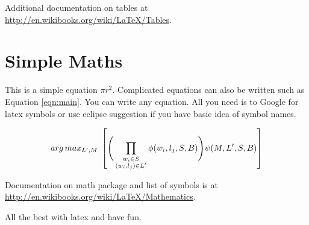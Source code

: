 \documentclass[bsc,logo]{infthesis}
\begin{document}
Additional documentation on tables at
\url{http://en.wikibooks.org/wiki/LaTeX/Tables}.

\section{Simple Maths}
This is a simple equation $\pi r^2$. Complicated equations can also be written
such as Equation \ref{eqn:main}. You can write any equation. All you need is to
Google for latex symbols or use eclipse suggestion if you have basic idea of symbol names.

 \begin{equation}
 \centering
 \label{eqn:main}
 arg\,max_{L', M} \; \left[ \Bigg(  \prod_{\substack{ w_i \in S \\  (w_i, l_j) 
 \in L'  }} \phi(w_i, l_j, S, B) \Bigg) \psi(M, L', S, B) \right]
 \end{equation}

Documentation on math package and list of symbols is at
\url{http://en.wikibooks.org/wiki/LaTeX/Mathematics}.


All the best with latex and have fun.




\end{document}
